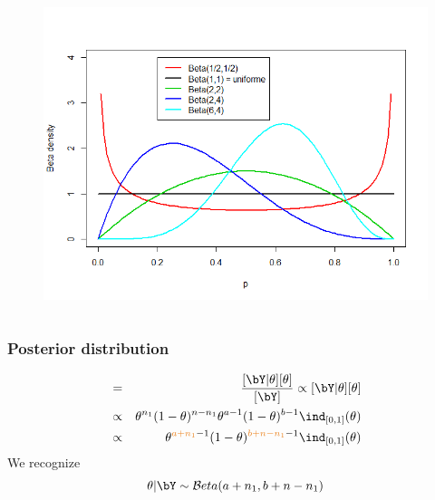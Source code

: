 \begin{frame}
\begin{columns}[t]
\begin{column}{0.45\linewidth}
  \begin{block}{}
     \begin{figure}
 \centering
 \includegraphics[width=\linewidth,height=\linewidth]{figures/plot_beta.png}
 \end{figure}
    \end{block}
  \end{column}
 \end{columns} 
\end{frame}


\begin{frame}\frametitle{Posterior distribution}

\begin{eqnarray*}
 [\theta | \bY] &=& \frac{[\bY | \theta] [\theta]}{[\bY]} \propto [\bY | \theta] [\theta] \\
 &\propto&    \theta^{n_1} (1-\theta)^{n-n_1} \theta ^{a-1} (1-\theta)^{b-1}  \ind_{[0,1]}(\theta)\\ 
 &\propto&   \theta^{{\vert a+ n_1}-1} (1-\theta)^{{\vert b+n-n_1}-1}   \ind_{[0,1]}(\theta)\\
\end{eqnarray*}
We recognize 
$$\theta | \bY \sim \mathcal{B}eta(a + n_1, b+n-n_1)$$



\end{frame}

